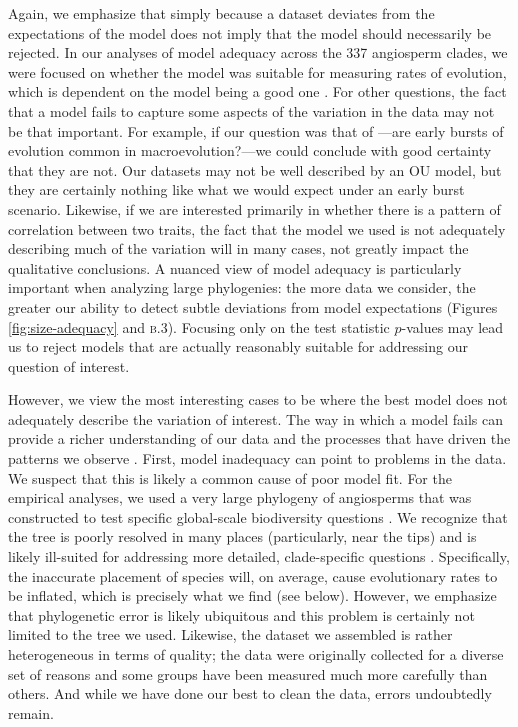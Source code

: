 Again, we emphasize that simply because a dataset deviates from the expectations of the model does not imply that the model should necessarily be rejected. In our analyses of model adequacy across the 337 angiosperm clades, we were focused on whether the model was suitable for measuring rates of evolution, which is dependent on the model being a good one \citep{Hunt2012}. For other questions, the fact that a model fails to capture some aspects of the variation in the data may not be that important. For example, if our question was that of \citet{Harmon2010}---are early bursts of evolution common in macroevolution?---we could conclude with good certainty that they are not. Our datasets may not be well described by an OU model, but they are certainly nothing like what we would expect under an early burst scenario. Likewise, if we are interested primarily in whether there is a pattern of correlation between two traits, the fact that the model we used is not adequately describing much of the variation will in many cases, not greatly impact the qualitative conclusions. A nuanced view of model adequacy is particularly important when analyzing large phylogenies: the more data we consider, the greater our ability to detect subtle deviations from model expectations (Figures \ref{fig:size-adequacy} and \textsc{b.3}). Focusing only on the test statistic $p$-values may lead us to reject models that are actually reasonably suitable for addressing our question of interest.

However, we view the most interesting cases to be where the best model does not adequately describe the variation of interest. The way in which a model fails can provide a richer understanding of our data and the processes that have driven the patterns we observe \citep{Gelman2012}. First, model inadequacy can point to problems in the data. We suspect that this is likely a common cause of poor model fit. For the empirical analyses, we used a very large phylogeny of angiosperms that was constructed to test specific global-scale biodiversity questions \citep{Zanne2013}. We recognize that the tree is poorly resolved in many places (particularly, near the tips) and is likely ill-suited for addressing more detailed, clade-specific questions \citep[see the recent critique by][]{DonoghueEdwards}. Specifically, the inaccurate placement of species will, on average, cause evolutionary rates to be inflated, which is precisely what we find (see below). However, we emphasize that phylogenetic error is likely ubiquitous and this problem is certainly not limited to the tree we used. Likewise, the dataset we assembled is rather heterogeneous in terms of quality; the data were originally collected for a diverse set of reasons and some groups have been measured much more carefully than others. And while we have done our best to clean the data, errors undoubtedly remain. 

